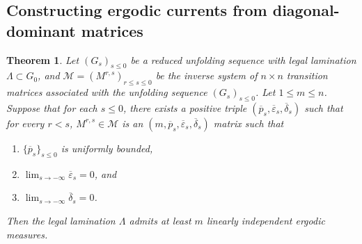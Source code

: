 \documentclass[11pt, letterpaper]{amsart}
\theoremstyle{plain}
\newtheorem{theorem}{Theorem}[section]
\theoremstyle{definition}
\newcommand{\calM}{\mathcal{M}}
\renewcommand{\epsilon}{\varepsilon}
\newcommand{\eps}{\epsilon}
\newcommand{\ov}[1]{\overline{#1}}
\begin{document}
\subsection{Constructing ergodic currents from diagonal-dominant matrices}

\begin{theorem} \label{thm:klp_then_ergodic}
Let $(G_s)_{s \le 0}$ be a reduced unfolding sequence with legal lamination $\Lambda \subset G_0$, and $\calM = (M^{r,s})_{r \le s \le 0}$ be the inverse system of $n \times n$ transition matrices associated with the unfolding sequence $(G_s)_{s \le 0}$. Let $1
\le m \le n$. Suppose that for each $s \le 0$, there exists a positive triple $(\ov{p}_s, \ov{\eps}_s,
\ov{\delta}_s)$ such that for every $r < s$, $M^{r,s} \in \calM$ is an $(m, \ov{p}_s,
\ov{\eps}_s,\ov{\delta}_s)$ matrix such that 
\begin{enumerate}[label=(\roman*)]
\item $\{\ov{p}_s\}_{s \le 0}$ is uniformly bounded,
\item $\lim_{s \to -\infty} \ov{\eps}_s =0$, and
\item $\lim_{s \to -\infty} \ov{\delta}_s =0$.
\end{enumerate}
Then the legal
lamination $\Lambda$ admits at least $m$ linearly independent ergodic measures.
\end{theorem}
\end{document}
